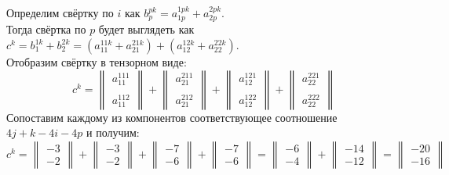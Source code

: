 \documentclass{article}
\begin{document}
\begin{center}
Определим свёртку по $i$ как $b^{pk}_p = a^{1pk}_{1p} + a^{2pk}_{2p}$. \\
Тогда свёртка по $p$ будет выглядеть как $c^k = b^{1k}_1 + b^{2k}_2 = \left (a^{11k}_{11} + a^{21k}_{21}\right ) + \left (a^{12k}_{12} + a^{22k}_{22}\right )$. \\
Отобразим свёртку в тензорном виде:
$$c^k = \begin{Vmatrix}
a^{111}_{11} \\ \, \\ a^{112}_{11}
\end{Vmatrix} + \begin{Vmatrix}
a^{211}_{21} \\ \, \\ a^{212}_{21}
\end{Vmatrix} + \begin{Vmatrix}
a^{121}_{12} \\ \, \\ a^{122}_{12}
\end{Vmatrix} + \begin{Vmatrix}
a^{221}_{22} \\ \, \\ a^{222}_{22}
\end{Vmatrix}$$
Сопоставим каждому из компонентов соответствующее соотношение $4j + k - 4i - 4p$ и получим:
$$c^k = \begin{Vmatrix}
-3 \\ -2
\end{Vmatrix} + \begin{Vmatrix}
-3 \\ -2
\end{Vmatrix} + \begin{Vmatrix}
-7 \\ -6
\end{Vmatrix} + \begin{Vmatrix}
-7 \\ -6
\end{Vmatrix} = \begin{Vmatrix}
-6 \\ -4
\end{Vmatrix} + \begin{Vmatrix}
-14 \\ -12
\end{Vmatrix} = \begin{Vmatrix}
-20 \\ -16
\end{Vmatrix}$$ 
\end{center}
\end{document}
